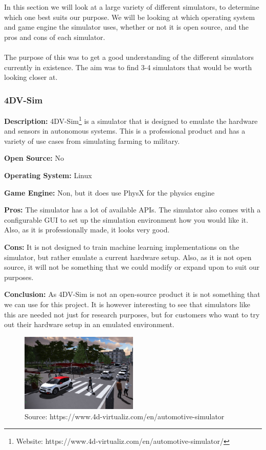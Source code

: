 In this section we will look at a large variety of different simulators, to determine which one best suits our purpose. We will be looking at which operating system and game engine the simulator uses, whether or not it is open source, and the pros and cons of each simulator. 
\\~\\
The purpose of this was to get a good understanding of the different simulators currently in existence. The aim was to find 3-4 simulators that would be worth looking closer at.

\subsubsection{4DV-Sim}
\textbf{Description:} 4DV-Sim\footnote{Website: https://www.4d-virtualiz.com/en/automotive-simulator/} is a simulator that is designed to emulate the hardware and sensors in autonomous systems. This is a professional product and has a variety of use cases from simulating farming to military.

\textbf{Open Source:} No

\textbf{Operating System:} Linux

\textbf{Game Engine:} Non, but it does use PhysX for the physics engine

\textbf{Pros:} The simulator has a lot of available APIs. The simulator also comes with a configurable GUI to set up the simulation environment how you would like it. Also, as it is professionally made, it looks very good.   

\textbf{Cons:} It is not designed to train machine learning implementations on the simulator, but rather emulate a current hardware setup. Also, as it is not open source, it will not be something that we could modify or expand upon to suit our purposes. 

\textbf{Conclusion:} As 4DV-Sim is not an open-source product it is not something that we can use for this project. It is however interesting to see that simulators like this are needed not just for research purposes, but for customers who want to try out their hardware setup in an emulated environment.


\begin{figure}[H]
    \centering
    \includegraphics[width=0.5\textwidth]{Simulators/4DV-Sim.jpg}
    \caption{Source: https://www.4d-virtualiz.com/en/automotive-simulator}
\end{figure}

